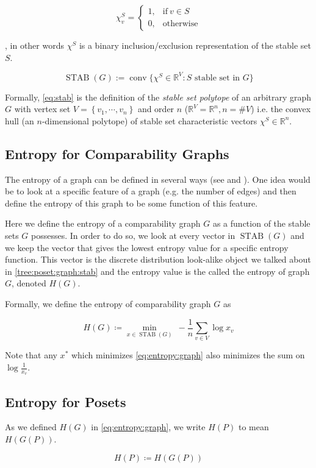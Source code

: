 $$ \chi^S_v =\begin{cases}
      1, & \text{if}\ v \in S\\
      0, & \text{otherwise}
    \end{cases}$$


, in other words $\chi^S$ is a binary inclusion/exclusion representation of the stable set $S$.

\begin{equation}
\operatorname{STAB}(G) := \operatorname{conv}\{\chi^S \in \mathbb{R}^V : S\text{ stable set in }G\}
\label{eq:stab}
\end{equation}

Formally, \ref{eq:stab} is the definition of the \emph{stable set polytope} of an arbitrary graph $G$ with vertex set $V = \left\{{v_1, \cdots, v_n }\right\}$ and order $n$ ($\mathbb{R}^V = \mathbb{R}^n, n = \#V$) i.e. the convex hull (an $n$-dimensional polytope) of stable set characteristic vectors $\chi^S \in \mathbb{R}^n$.



\subsection{Entropy for Comparability Graphs}

The entropy of a graph can be defined in several ways (see \cite{mowshowitz2012entropy} and \cite{simonyi1995graph}). One idea would be to look at a specific feature of a graph (e.g. the number of edges) and then define the entropy of this graph to be some function of this feature.

Here we define the entropy of a comparability graph $G$ as a function of the stable sets $G$ possesses. In order to do so, we look at every vector in $\operatorname{STAB}(G)$ and we keep the vector that gives the lowest entropy value for a specific entropy function. This vector is the discrete distribution look-alike object we talked about in \ref{tree:poset:graph:stab} and the entropy value is the called the entropy of graph $G$, denoted ${H}(G)$.

Formally, we define the entropy of comparability graph $G$ as

\begin{equation}
{H}(G) \coloneqq \min_{x \in \operatorname{STAB}(G)}~ -\frac{1}{n} \sum_{v \in V} \log x_v
\label{eq:entropy:graph}
\end{equation}

Note that any $x^*$ which minimizes \ref{eq:entropy:graph} also minimizes the sum on $\log \frac{1}{x_v}$.



\subsection{Entropy for Posets}


As we defined ${H}(G)$ in \ref{eq:entropy:graph}, we write ${H}(P)$ to mean ${H}(G(P))$.

\begin{equation}
{H}(P) \coloneqq {H}({G}(P))
\label{eq:entropy:poset}
\end{equation}
